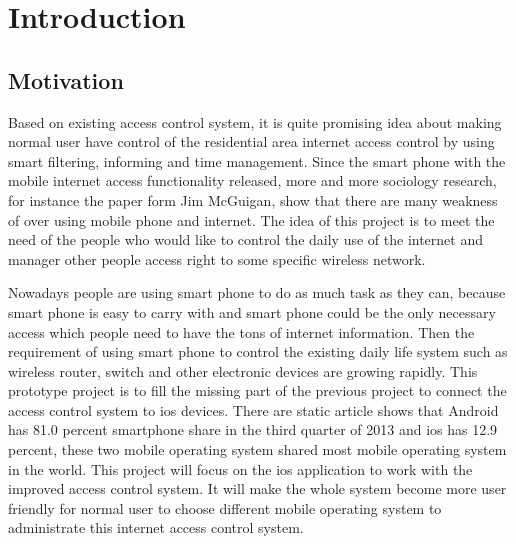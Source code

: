 \chapter{Introduction}
\label{chp:intro}

\section{Motivation}
\par Based on existing access control system, it is quite promising idea about making normal user have control of the residential area internet access control by using smart filtering, informing and time management. Since the smart phone with the mobile internet access functionality released, more and more sociology research, for instance the paper form Jim McGuigan\cite{MobilePhoneSociology}, show that there are many weakness of over using mobile phone and internet. The idea of this project is to  meet the need of the people who would like to control the daily use of the internet and manager other people access right to some specific wireless network.
\par Nowadays people are using smart phone to do as much task as they can, because smart phone is easy to carry with and smart phone could be the only necessary access which people need to have the tons of internet information. Then the requirement of using smart phone to control the existing daily life system such as wireless router, switch and other electronic devices are growing rapidly. This prototype project is to fill the missing part of the previous project to connect the access control system to \gls{ios} devices. There are static article\cite{MobileOSMarketShare} shows that Android has 81.0 percent smartphone share in the third quarter of 2013  and \gls{ios} has 12.9 percent, these two mobile operating system shared most mobile operating system in the world. This project will focus on the \gls{ios} application to work with the improved access control system. It will make the whole system become more user friendly for normal user to choose different mobile operating system to administrate this internet access control system.

